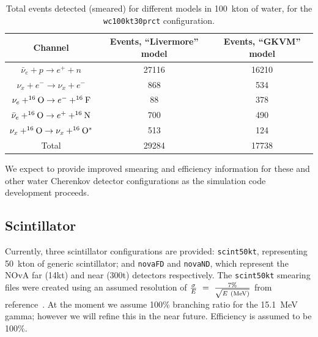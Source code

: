 \documentclass[12pt]{article}
\begin{document}
\begin{table}[h]
\centering
\begin{tabular}{|c|c|c|}
\hline
Channel & Events, ``Livermore'' model & Events, ``GKVM'' model  \\
\hline
   $\bar{\nu}_e+ p \rightarrow e^+ + n$                  &  27116 &   16210\\
$\nu_x + e^- \rightarrow \nu_x + e^-$                           & 868 &   534\\
$\nu_e + ^{16}{\rm O} \rightarrow e^- + ^{16}{\rm F}$                         & 88  &  378  \\
$\bar{\nu}_e + ^{16}{\rm O} \rightarrow e^+ + ^{16}{\rm N}$  & 700 &  490 \\


$\nu_x + ^{16}{\rm O} \rightarrow \nu_x+ ^{16}{\rm O}^*$
                         &  513 &  124 \\ \hline
Total &  29284 & 17738 \\ \hline
\end{tabular}
\caption{Total events detected (smeared) for different models in 100~kton of water, for the
\texttt{wc100kt30prct} configuration. }
\label{tab:wctable}
\end{table}

We expect to provide improved smearing and efficiency information for
these and other water Cherenkov detector configurations as the
simulation code development proceeds.

\subsection{Scintillator}

Currently, three scintillator configurations are provided:
\texttt{scint50kt}, representing 50~kton of generic scintillator; and \texttt{novaFD}
and \texttt{novaND}, which represent the NOvA far (14kt) and near (300t)
detectors respectively. The \texttt{scint50kt} smearing files were created using
an assumed resolution of $\frac{\sigma}{E}~=~\frac{7\%}{\sqrt{E~({\rm MeV})}}$
from reference~\cite{Eguchi:2002dm}.  At the moment we assume 100\% branching ratio for the 15.1~MeV gamma; however we will refine this in the near future.
Efficiency is assumed to be 100\%.

\end{document}
